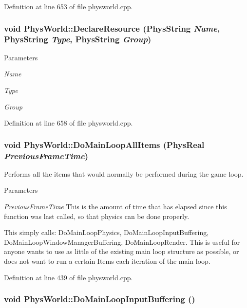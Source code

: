 Definition at line 653 of file physworld.cpp.\hypertarget{classPhysWorld_a908c21f7f5452f8d7c6d4b5b2308ba5e}{
\subsubsection[{DeclareResource}]{\setlength{\rightskip}{0pt plus 5cm}void PhysWorld::DeclareResource (PhysString {\em Name}, \/  PhysString {\em Type}, \/  PhysString {\em Group})}}
\label{db/df5/classPhysWorld_a908c21f7f5452f8d7c6d4b5b2308ba5e}

\begin{DoxyParams}{Parameters}
\item[{\em Name}]\item[{\em Type}]\item[{\em Group}]\end{DoxyParams}


Definition at line 658 of file physworld.cpp.\hypertarget{classPhysWorld_a174da29a119080c44ba628cb25918f8c}{
\subsubsection[{DoMainLoopAllItems}]{\setlength{\rightskip}{0pt plus 5cm}void PhysWorld::DoMainLoopAllItems (PhysReal {\em PreviousFrameTime})}}
\label{db/df5/classPhysWorld_a174da29a119080c44ba628cb25918f8c}


Performs all the items that would normally be performed during the game loop. 
\begin{DoxyParams}{Parameters}
\item[{\em PreviousFrameTime}]This is the amount of time that has elapsed since this function was last called, so that physics can be done properly.\end{DoxyParams}
This simply calls: DoMainLoopPhysics, DoMainLoopInputBuffering, DoMainLoopWindowManagerBuffering, DoMainLoopRender. This is useful for anyone wants to use as little of the existing main loop structure as possible, or does not want to run a certain Items each iteration of the main loop. 

Definition at line 439 of file physworld.cpp.\hypertarget{classPhysWorld_a81b3f0dcc0a90d039623f696343e6e9c}{
\subsubsection[{DoMainLoopInputBuffering}]{\setlength{\rightskip}{0pt plus 5cm}void PhysWorld::DoMainLoopInputBuffering ()}}
\label{db/df5/classPhysWorld_a81b3f0dcc0a90d039623f696343e6e9c}


